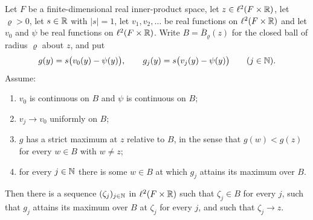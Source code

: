 \begin{lemma}
Let $F$ be a finite-dimensional real inner-product space, let
$z\in\ell^2(F\times\mathbb{R})$, let $\varrho>0$, let $s\in\mathbb{R}$ with $|s|=1$, let
$v_1,v_2,\ldots$ be real functions on $\ell^2(F\times\mathbb{R})$ and let $v_0$ and
$\psi$ be real functions on $\ell^2(F\times\mathbb{R})$. Write
$B=\overline B_\varrho(z)$ for the closed ball of radius $\varrho$ about $z$,
and put
\[
  g(y)=s\bigl(v_0(y)-\psi(y)\bigr),\qquad
  g_j(y)=s\bigl(v_j(y)-\psi(y)\bigr)\qquad(j\in\mathbb{N}).
\]
Assume:
\begin{enumerate}
\item $v_0$ is continuous on $B$ and $\psi$ is continuous on $B$;
\item $v_j\to v_0$ uniformly on $B$;
\item $g$ has a strict maximum at $z$ relative to $B$, in the sense that
$g(w)<g(z)$ for every $w\in B$ with $w\ne z$;
\item for every $j\in\mathbb{N}$ there is some $w\in B$ at which $g_j$ attains its
maximum over $B$.
\end{enumerate}
Then there is a sequence $(\zeta_j)_{j\in\mathbb{N}}$ in $\ell^2(F\times\mathbb{R})$ such that
$\zeta_j\in B$ for every $j$, such that $g_j$ attains its maximum over $B$ at
$\zeta_j$ for every $j$, and such that $\zeta_j\to z$.
\end{lemma}
